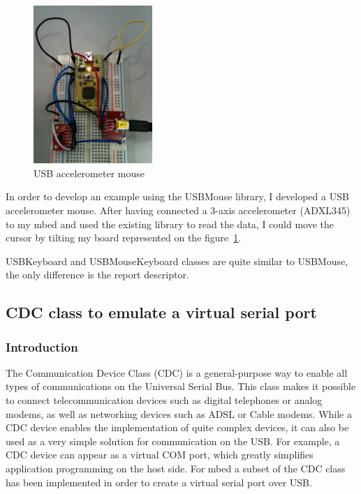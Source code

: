 \documentclass[pdftex,10pt,a4paper]{report}
\begin{document}
\begin{figure}[h!]
		\centering
		\includegraphics[width=0.4\textwidth]{./usb_acc_mouse.jpg}
		\caption{USB accelerometer mouse}
		\label{USB accelerometer mouse}
\end{figure}

In order to develop an example using the USBMouse library, I developed a USB accelerometer mouse. After having connected a 3-axis accelerometer (ADXL345) to my mbed and used the existing library to read the data, I could move the cursor by tilting my board represented on the figure~\ref{USB accelerometer mouse}.

USBKeyboard and USBMouseKeyboard classes are quite similar to USBMouse, the only difference is the report descriptor. 


\subsection{CDC class to emulate a virtual serial port}
\subsubsection{Introduction}
The Communication Device Class (CDC) is a general-purpose way to enable all
types of communications on the Universal Serial Bus. This class makes it possible
to connect telecommunication devices such as digital telephones or analog
modems, as well as networking devices such as ADSL or Cable modems.
While a CDC device enables the implementation of quite complex devices, it can also
be used as a very simple solution for communication on the USB. For example, a CDC
device can appear as a virtual COM port, which greatly simplifies application programming
on the host side. For mbed a subset of the CDC class has been implemented in order to create
a virtual serial port over USB.
\end{document}
